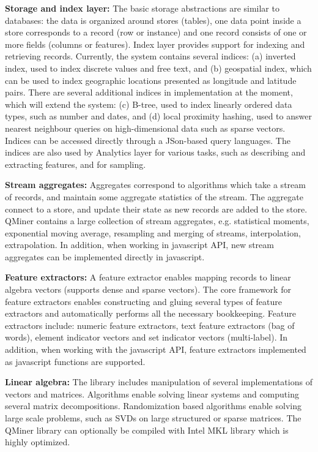 \documentclass{article} %
\begin{document}
\textbf{Storage and index layer:} The basic storage abstractions are similar to databases: the data is organized around stores (tables), one data point inside a store corresponds to a record (row or instance) and one record consists of one or more fields (columns or features). Index layer provides support for indexing and retrieving records. Currently, the system contains several indices: (a) inverted index, used to index discrete values and free text, and (b) geospatial index, which can be used to index geographic locations presented as longitude and latitude pairs. There are several additional indices in implementation at the moment, which will extend the system: (c) B-tree, used to index linearly ordered data types, such as number and dates, and (d) local proximity hashing, used to answer nearest neighbour queries on high-dimensional data such as sparse vectors. Indices can be accessed directly through a JSon-based query languages. The indices are also used by Analytics layer for various tasks, such as describing and extracting features, and for sampling.

\textbf{Stream aggregates:} Aggregates correspond to algorithms which take a stream of records, and maintain some aggregate statistics of the stream. The aggregate connect to a store, and update their state as new records are added to the store. QMiner contains a large collection of stream aggregates, e.g. statistical moments, exponential moving average, resampling and merging of streams, interpolation, extrapolation. In addition, when working in javascript API, new stream aggregates can be implemented directly in javascript.

\textbf{Feature extractors:} A feature extractor enables mapping records to linear algebra vectors (supports dense and sparse vectors). The core framework for feature extractors enables constructing and gluing several types of feature extractors and automatically performs all the necessary bookkeeping. Feature extractors include: numeric feature extractors, text feature extractors (bag of words), element indicator vectors and set indicator vectors (multi-label). In addition, when working with the javascript API, feature extractors implemented as javascript functions are supported.

\textbf{Linear algebra:} The library includes manipulation of several implementations of vectors and matrices. Algorithms enable solving linear systems and computing several matrix decompositions. Randomization based algorithms enable solving large scale problems, such as SVDs on large structured or sparse matrices. The QMiner library can optionally be compiled with Intel MKL library which is highly optimized.
\end{document}
